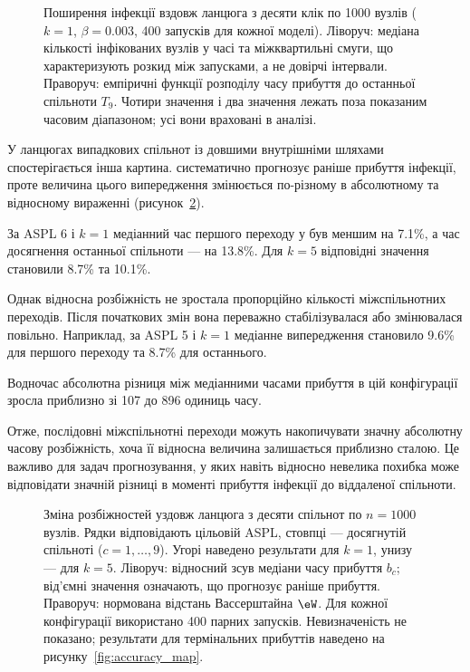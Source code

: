 \begin{figure}[tbp]
\centering
\caption{%
Поширення інфекції вздовж ланцюга
з десяти клік по 1000 вузлів
($k=1$, $\beta=0.003$, 400 запусків
для кожної моделі).
Ліворуч: медіана кількості інфікованих
вузлів у часі та міжквартильні смуги,
що характеризують розкид між запусками,
а не довірчі інтервали.
Праворуч: емпіричні функції розподілу
часу прибуття до останньої спільноти
$T_9$. Чотири значення \Full{}
і два значення \TS{} лежать поза
показаним часовим діапазоном;
усі вони враховані в аналізі.
}
\label{fig:chain_cliques}
\end{figure}

У ланцюгах випадкових спільнот
із довшими внутрішніми шляхами
спостерігається інша картина.
\TS{} систематично прогнозує
раніше прибуття інфекції,
проте величина цього випередження
змінюється по-різному в абсолютному
та відносному вираженні
(рисунок~\ref{fig:chain_heatmap}).

За ASPL 6 і $k=1$ медіанний
час першого переходу у \TS{}
був меншим на 7.1\%,
а час досягнення останньої спільноти
--- на 13.8\%.
Для $k=5$ відповідні значення
становили 8.7\% та 10.1\%.

Однак відносна розбіжність
не зростала пропорційно кількості
міжспільнотних переходів.
Після початкових змін вона
переважно стабілізувалася
або змінювалася повільно.
Наприклад, за ASPL 5 і $k=1$
медіанне випередження становило
9.6\% для першого переходу
та 8.7\% для останнього.

Водночас абсолютна різниця
між медіанними часами прибуття
в цій конфігурації зросла
приблизно зі 107 до 896
одиниць часу.

Отже, послідовні міжспільнотні
переходи можуть накопичувати
значну абсолютну часову розбіжність,
хоча її відносна величина
залишається приблизно сталою.
Це важливо для задач прогнозування,
у яких навіть відносно невелика
похибка може відповідати значній
різниці в моменті прибуття інфекції
до віддаленої спільноти.

\begin{figure}[tbp]
\centering
\caption{%
Зміна розбіжностей уздовж ланцюга
з десяти спільнот по $n=1000$ вузлів.
Рядки відповідають цільовій ASPL,
стовпці --- досягнутій спільноті
($c=1,\ldots,9$).
Угорі наведено результати для $k=1$,
унизу --- для $k=5$.
Ліворуч: відносний зсув медіани
часу прибуття $b_c$;
від'ємні значення означають,
що \TS{} прогнозує раніше прибуття.
Праворуч: нормована відстань
Вассерштайна $\eW$.
Для кожної конфігурації використано
400 парних запусків. Невизначеність
не показано; результати для
термінальних прибуттів наведено
на рисунку~\ref{fig:accuracy_map}.
}
\label{fig:chain_heatmap}
\end{figure}


